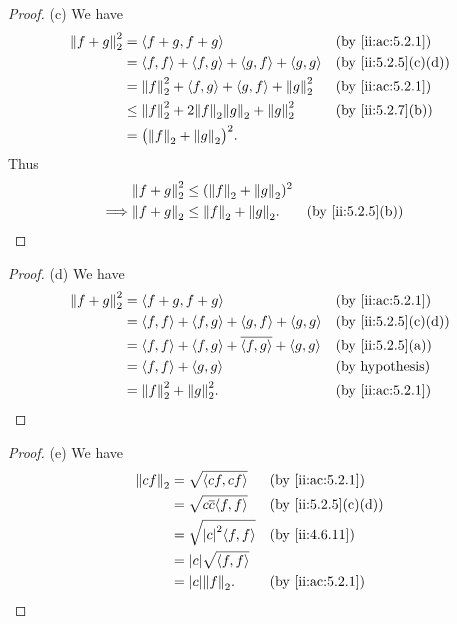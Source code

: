 \begin{proof}{(c)}
  We have
  \begin{align*}
    \norm*{f + g}_2^2 & = \inner*{f + g, f + g}                                         &  & \by{ii:ac:5.2.1}   \\
                      & = \inner*{f, f} + \inner*{f, g} + \inner*{g, f} + \inner*{g, g} &  & \by{ii:5.2.5}[c,d] \\
                      & = \norm*{f}_2^2 + \inner*{f, g} + \inner*{g, f} + \norm*{g}_2^2 &  & \by{ii:ac:5.2.1}   \\
                      & \leq \norm*{f}_2^2 + 2 \norm*{f}_2 \norm*{g}_2 + \norm*{g}_2^2  &  & \by{ii:5.2.7}[b]   \\
                      & = \big(\norm*{f}_2 + \norm*{g}_2\big)^2.
  \end{align*}
  Thus
  \begin{align*}
             & \norm*{f + g}_2^2 \leq (\norm*{f}_2 + \norm*{g}_2)^2                       \\
    \implies & \norm*{f + g}_2 \leq \norm*{f}_2 + \norm*{g}_2.      &  & \by{ii:5.2.5}[b]
  \end{align*}
\end{proof}

\begin{proof}{(d)}
  We have
  \begin{align*}
    \norm*{f + g}_2^2 & = \inner*{f + g, f + g}                                                    &  & \by{ii:ac:5.2.1}       \\
                      & = \inner*{f, f} + \inner*{f, g} + \inner*{g, f} + \inner*{g, g}            &  & \by{ii:5.2.5}[c,d]     \\
                      & = \inner*{f, f} + \inner*{f, g} + \overline{\inner*{f, g}} + \inner*{g, g} &  & \by{ii:5.2.5}[a]       \\
                      & = \inner*{f, f} + \inner*{g, g}                                            &  & \text{(by hypothesis)} \\
                      & = \norm*{f}_2^2 + \norm*{g}_2^2.                                           &  & \by{ii:ac:5.2.1}
  \end{align*}
\end{proof}

\begin{proof}{(e)}
  We have
  \begin{align*}
    \norm*{cf}_2 & = \sqrt{\inner*{cf, cf}}              &  & \by{ii:ac:5.2.1}   \\
                 & = \sqrt{c \overline{c} \inner*{f, f}} &  & \by{ii:5.2.5}[c,d] \\
                 & = \sqrt{\abs{c}^2 \inner*{f, f}}      &  & \by{ii:4.6.11}     \\
                 & = \abs{c} \sqrt{\inner*{f, f}}                                \\
                 & = \abs{c} \norm*{f}_2.                &  & \by{ii:ac:5.2.1}
  \end{align*}
\end{proof}

